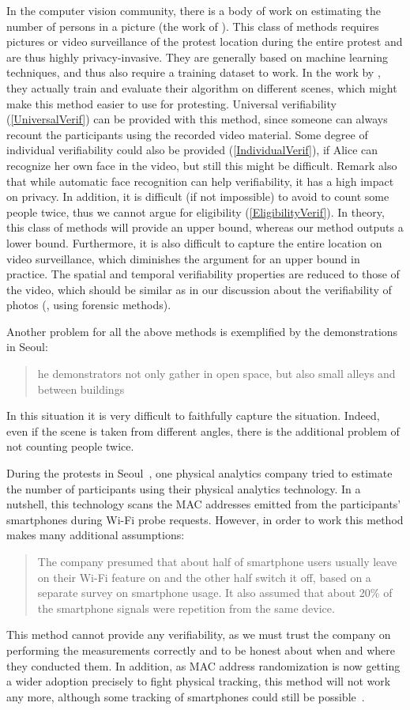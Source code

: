 In the computer vision community, there is a body of work on estimating the number of persons in a picture (\eg the work of \citet{NNCrowdCounting}).
This class of methods requires pictures or video surveillance of the protest location during the entire protest and are thus highly privacy-invasive.
They are generally based on machine learning techniques, and thus also require a training dataset to work.
In the work by \cite{NNCrowdCounting}, they actually train and evaluate their algorithm on different scenes, which might make this method easier to use for protesting.
Universal verifiability (\cref{UniversalVerif}) can be provided with this method, since someone can always recount the participants using the recorded video material.
Some degree of individual verifiability could also be provided (\cref{IndividualVerif}), if Alice can recognize her own face in the video, but still this might be difficult. 
Remark also that while automatic face recognition can help verifiability, it has a high impact on privacy.
In addition, it is difficult (if not impossible) to avoid to count some people twice, thus we cannot argue for eligibility (\cref{EligibilityVerif}).
In theory, this class of methods will provide an upper bound, whereas our method outputs a lower bound.
Furthermore, it is also difficult to capture the entire location on video surveillance, which diminishes the argument for an upper bound in practice.
The spatial and temporal verifiability properties are reduced to those of the video, which should be similar as in our discussion about the verifiability of photos (\ie, using forensic methods).

Another problem for all the above methods is exemplified by the demonstrations in Seoul:
\blockcquote{2016DemonstrationsInSeoul}{%
  he demonstrators not only gather in open space, but also small alleys and between buildings%
}.
In this situation it is very difficult to faithfully capture the situation.
Indeed, even if the scene is taken from different angles, there is the additional problem of not counting people twice.

During the protests in Seoul~\cite{2016DemonstrationsInSeoul}, one physical analytics company tried to estimate the number of participants using their physical analytics technology.
In a nutshell, this technology scans the MAC addresses emitted from the participants' smartphones during Wi-Fi probe requests.
However, in order to work this method makes many additional assumptions:
\blockcquote{2016DemonstrationsInSeoul}{%
The company presumed that about half of smartphone users usually leave on their Wi-Fi feature on and the other half switch it off, based on a separate survey on smartphone usage. 
It also assumed that about 20\% of the smartphone signals were repetition from the same device.
}
This method cannot provide any verifiability, as we must trust the company on performing the measurements correctly and to be honest about when and where they conducted them.
In addition, as MAC address randomization is now getting a wider adoption precisely to fight physical tracking, this method will not work any more, although some tracking of smartphones could still be possible~\cite{WhyMACRandomizationIsNotEnough}.

